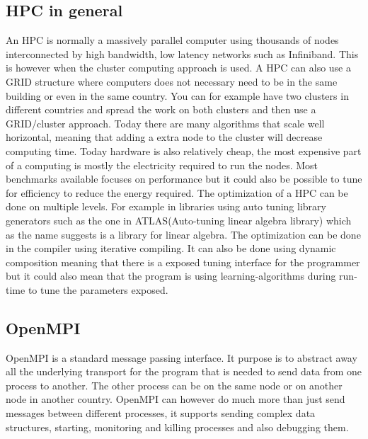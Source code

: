 \documentclass[thesis.tex]{subfiles}
\begin{document}
\subsection{HPC in general}
An HPC is normally a massively parallel computer using thousands of nodes interconnected by high bandwidth, low latency networks such as Infiniband\cite{infiniband}. This is however when the cluster computing approach is used. A HPC can also use a GRID structure where computers does not necessary need to be in the same building or even in the same country. You can for example have two clusters in different countries and spread the work on both clusters and then use a GRID/cluster approach. 
\newline
\newline
Today there are many algorithms that scale well horizontal, meaning that adding a extra node to the cluster will decrease computing time. Today hardware is also relatively cheap, the most expensive part of a computing is mostly the electricity required to run the nodes. Most benchmarks available focuses on performance but it could also be possible to tune for efficiency to reduce the energy required.
\newline
\newline
The optimization of a HPC can be done on multiple levels. For example in libraries using auto tuning library generators such as the one in ATLAS(Auto-tuning linear algebra library) which as the name suggests is a library for linear algebra. The optimization can be done in the compiler using iterative compiling. It can also be done using dynamic composition meaning that there is a exposed tuning interface for the programmer but it could also mean that the program is using learning-algorithms during run-time to tune the parameters exposed.
\subsection{OpenMPI}
OpenMPI is a standard message passing interface. It purpose is to abstract away all the underlying transport for the program that is needed to send data from one process to another. The other process can be on the same node or on another node in another country.
OpenMPI can however do much more than just send messages between different processes, it supports sending complex data structures, starting, monitoring and killing processes and also debugging them.
\end{document}

